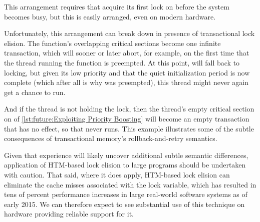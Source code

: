 \QuickQuizEnd

\begin{fcvref}
This arrangement requires that  acquire its first
lock on  before the system becomes busy, but this is easily
arranged, even on modern hardware.

Unfortunately, this arrangement can break down in presence of transactional
lock elision.
The  function's overlapping critical sections become
one infinite transaction, which will sooner or later abort,
for example, on the first time that the thread running
the  function is preempted.
At this point,  will fall back to locking, but given
its low priority and that the quiet initialization period is now
complete (which after all is why  was preempted),
this thread might never again get a chance to run.

And if the  thread is not holding the lock, then
the  thread's empty critical section on  of
\cref{lst:future:Exploiting Priority Boosting}
will become an empty transaction that has no effect, so that
 never runs.
This example illustrates some of the subtle consequences of
transactional memory's rollback-and-retry semantics.
\end{fcvref}

Given that experience will likely uncover additional subtle semantic
differences, application of HTM-based lock elision to large programs
should be undertaken with caution.
That said, where it does apply, HTM-based lock elision can eliminate
the cache misses associated with the lock variable, which has resulted
in tens of percent performance increases in large real-world software
systems as of early 2015.
We can therefore expect to see substantial use of this technique on
hardware providing reliable support for it.

\QuickQuizEnd

